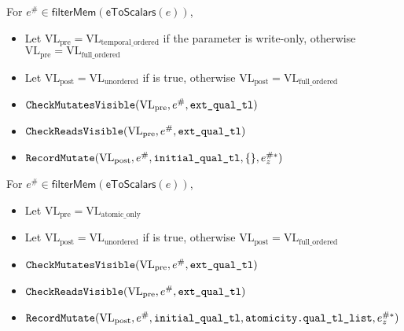 
For $e^\# \in \mathsf{filterMem}(\mathsf{eToScalars}(e))$,
\begin{itemize}
  \item Let $\mathrm{VL_{pre}} = \mathrm{VL_{temporal\_ordered}}$ if the parameter is write-only, otherwise $\mathrm{VL_{pre}} = \mathrm{VL_{full\_ordered}}$
  \item Let $\mathrm{VL_{post}} = \mathrm{VL_{unordered}}$ if  is true, otherwise $\mathrm{VL_{post}} = \mathrm{VL_{full\_ordered}}$
  \item ${\color{black}\texttt{CheckMutatesVisible}}(\mathrm{VL_{pre}}, e^\#, {\color{black}\texttt{ext\_qual\_tl}})$
  \item ${\color{black}\texttt{CheckReadsVisible}}(\mathrm{VL_{pre}}, e^\#, {\color{black}\texttt{ext\_qual\_tl}})$
  \item ${\color{black}\texttt{RecordMutate}}(\mathrm{VL_{post}}, e^\#, {\color{black}\texttt{initial\_qual\_tl}}, \{\}, e_z^{\#*})$
\end{itemize}


For $e^\# \in \mathsf{filterMem}(\mathsf{eToScalars}(e))$,
\begin{itemize}
  \item Let $\mathrm{VL_{pre}} = \mathrm{VL_{atomic\_only}}$
  \item Let $\mathrm{VL_{post}} = \mathrm{VL_{unordered}}$ if  is true, otherwise $\mathrm{VL_{post}} = \mathrm{VL_{full\_ordered}}$
  \item ${\color{black}\texttt{CheckMutatesVisible}}(\mathrm{VL_{pre}}, e^\#, {\color{black}\texttt{ext\_qual\_tl}})$
  \item ${\color{black}\texttt{CheckReadsVisible}}(\mathrm{VL_{pre}}, e^\#, {\color{black}\texttt{ext\_qual\_tl}})$
  \item ${\color{black}\texttt{RecordMutate}}(\mathrm{VL_{post}}, e^\#, {\color{black}\texttt{initial\_qual\_tl}}, {\color{black}\texttt{atomicity.qual\_tl\_list}}, e_z^{\#*})$
\end{itemize}


